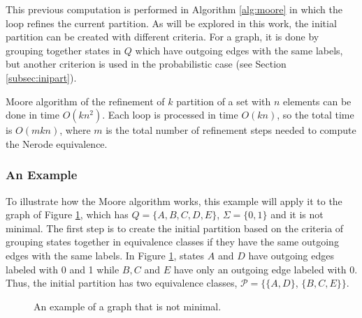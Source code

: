 { This previous computation is performed in Algorithm \ref{alg:moore} in which the loop refines the current partition. As will be explored in this work, the initial partition can be created with different criteria. For a graph, it is done by grouping together states in $Q$ which have outgoing edges with the same labels, but another criterion is used in the probabilistic case (see Section \ref{subsec:inipart}).

Moore algorithm of the refinement of $k$ partition of a set with $n$ elements can be done in time $O(kn^2)$. Each loop is processed in time $O(kn)$, so the total time is $O(m kn)$, where $m$ is the total number of refinement steps needed to compute the Nerode equivalence.

\subsubsection{An Example}

To illustrate how the Moore algorithm works, this example will apply it to the graph of Figure \ref{fig:moore_ex}, which has $Q = \{A, B, C, D, E\}$, $\Sigma = \{0, 1\}$ and it is not minimal. The first step is to create the initial partition based on the criteria of grouping states together in equivalence classes if they have the same outgoing edges with the same labels. In Figure \ref{fig:moore_ex}, states $A$ and $D$ have outgoing edges labeled with 0 and 1 while $B, C$ and $E$ have only an outgoing edge labeled with 0. Thus, the initial partition has two equivalence classes, $\mathcal{P} = \{\{A,D\}$,  $\{B,C,E\}\}$.

\begin{figure}
\centering
{}
\caption{An example of a graph that is not minimal.\label{fig:moore_ex}}
\end{figure}

}
